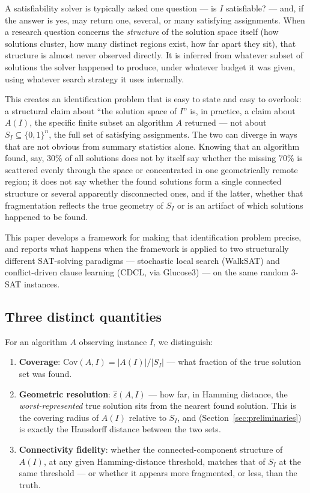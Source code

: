 \documentclass[11pt]{article}
\theoremstyle{definition}
\theoremstyle{remark}
\newcommand{\Shat}{S_I}
\newcommand{\Ahat}[1]{A(#1)}
\newcommand{\epshat}{\hat\varepsilon}
\newcommand{\Cov}{\mathrm{Cov}}
\begin{document}
A satisfiability solver is typically asked one question --- is $I$ satisfiable? --- and, if the answer is yes, may return one, several, or many satisfying assignments. When a research question concerns the \emph{structure} of the solution space itself (how solutions cluster, how many distinct regions exist, how far apart they sit), that structure is almost never observed directly. It is inferred from whatever subset of solutions the solver happened to produce, under whatever budget it was given, using whatever search strategy it uses internally.

This creates an identification problem that is easy to state and easy to overlook: a structural claim about ``the solution space of $I$'' is, in practice, a claim about $\Ahat{I}$, the specific finite subset an algorithm $A$ returned --- not about $\Shat \subseteq \{0,1\}^n$, the full set of satisfying assignments. The two can diverge in ways that are not obvious from summary statistics alone. Knowing that an algorithm found, say, 30\% of all solutions does not by itself say whether the missing 70\% is scattered evenly through the space or concentrated in one geometrically remote region; it does not say whether the found solutions form a single connected structure or several apparently disconnected ones, and if the latter, whether that fragmentation reflects the true geometry of $\Shat$ or is an artifact of which solutions happened to be found.

This paper develops a framework for making that identification problem precise, and reports what happens when the framework is applied to two structurally different SAT-solving paradigms --- stochastic local search (WalkSAT) and conflict-driven clause learning (CDCL, via Glucose3) --- on the same random 3-SAT instances.

\subsection{Three distinct quantities}

For an algorithm $A$ observing instance $I$, we distinguish:

\begin{enumerate}[label=(\arabic*)]
\item \textbf{Coverage}: $\Cov(A,I) = |\Ahat{I}| / |\Shat|$ --- what fraction of the true solution set was found.
\item \textbf{Geometric resolution}: $\epshat(A,I)$ --- how far, in Hamming distance, the \emph{worst-represented} true solution sits from the nearest found solution. This is the covering radius of $\Ahat{I}$ relative to $\Shat$, and (Section~\ref{sec:preliminaries}) is exactly the Hausdorff distance between the two sets.
\item \textbf{Connectivity fidelity}: whether the connected-component structure of $\Ahat{I}$, at any given Hamming-distance threshold, matches that of $\Shat$ at the same threshold --- or whether it appears more fragmented, or less, than the truth.
\end{enumerate}
\end{document}
